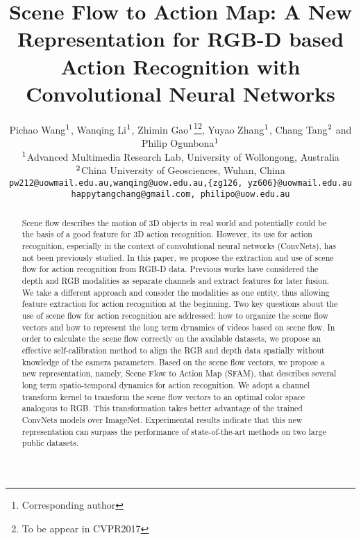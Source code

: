 \documentclass[10pt,twocolumn,letterpaper]{article}
\begin{document}
\title{Scene Flow to Action Map: A New Representation for RGB-D based\\ Action Recognition with Convolutional Neural Networks}

\author{Pichao Wang$^{\rm 1}$, Wanqing Li$^{\rm 1}$, Zhimin Gao$^{\rm 1}$\thanks{Corresponding author}\thanks{To be appear in CVPR2017}, Yuyao Zhang$^{\rm 1}$, Chang Tang$^{\rm 2}$ and Philip Ogunbona$^{\rm 1}$\\
$^{\rm 1}$Advanced Multimedia Research Lab, University of Wollongong, Australia\\
$^{\rm 2}$China University of Geosciences, Wuhan, China\\
{\tt\small pw212@uowmail.edu.au,wanqing@uow.edu.au,\{zg126, yz606\}@uowmail.edu.au}\\ {\tt\small happytangchang@gmail.com, philipo@uow.edu.au}\\
}


\maketitle


\begin{abstract}
Scene flow describes the motion of 3D objects in 
real world and potentially could be the basis of a good feature for 3D action 
recognition. However, its use for action recognition, especially in the context 
of convolutional neural networks (ConvNets), has not been previously studied. 
In this paper, we propose the extraction and use of scene flow for action 
recognition from RGB-D data. Previous works have considered the depth and RGB 
modalities as separate channels and extract features for later fusion. 
We take a different approach and consider the modalities as one entity, thus 
allowing feature extraction for action recognition at the beginning.   
Two key questions about the use of scene flow for action recognition are 
addressed: how to organize the scene flow vectors and how to represent the long 
term dynamics of videos based on scene flow. In order to calculate the scene 
flow correctly on the available datasets, we propose an effective 
self-calibration method to align the RGB and depth data spatially without 
knowledge of the camera parameters. Based on the scene flow vectors, we propose 
a new representation, namely, Scene Flow to Action Map 
(SFAM), that describes several long term spatio-temporal dynamics for action 
recognition. We adopt a channel transform kernel to 
transform the scene flow vectors to an optimal color space analogous to RGB.  
This transformation takes better advantage of the trained ConvNets models over 
ImageNet. Experimental results indicate that this new representation can 
surpass the performance of state-of-the-art methods on two large 
public datasets.

\end{abstract}
\end{document}

